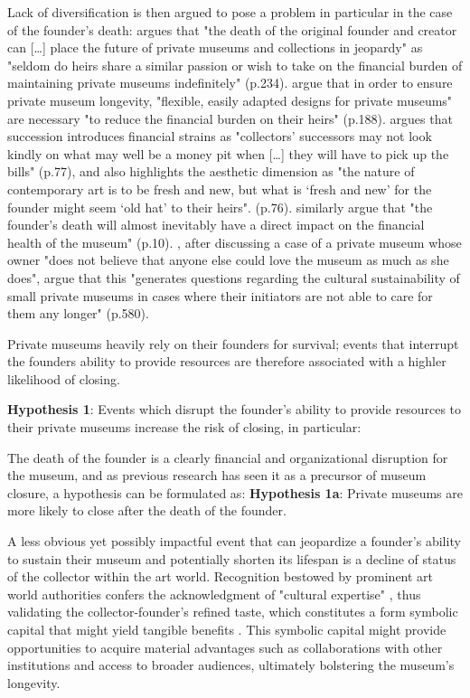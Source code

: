 \documentclass[12pt]{article}
\begin{document}
Lack of diversification is then argued to pose a problem in particular in the case of the founder's death:
\textcite{Walker_2019_collector} argues that "the death of the original founder and creator can [\ldots{}] place the future of private museums and collections in jeopardy" as "seldom do heirs share a similar passion or wish to take on the financial burden of maintaining private museums indefinitely" (p.234). 
\textcite{Bechtler_Imhof_2018_future} argue that in order to ensure private museum longevity, "flexible, easily adapted designs for private museums" are necessary "to reduce the financial burden on their heirs" (p.188).
\textcite{Adam_2021_rise} argues that succession introduces financial strains as "collectors’ successors may not look kindly on what may well be a money pit when [\ldots{}] they will have to pick up the bills" (p.77), and also highlights the aesthetic dimension as "the nature of contemporary art is to be fresh and new, but what is ‘fresh and new’ for the founder might seem ‘old hat’ to their heirs". (p.76).
\textcite{Velthuis_Gera_2024_fragility} similarly argue that "the founder’s death will almost inevitably have a direct impact on the financial health of the museum" (p.10).
\textcite{StylianouLambert_etal_2014_museums}, after discussing a case of a private museum whose owner "does not believe that anyone else could love the museum as much as she does", argue that this "generates questions regarding the cultural sustainability of small private museums in cases where their initiators are not able to care for them any longer" (p.580).



Private museums heavily rely on their founders for survival; events that interrupt the founders ability to provide resources are therefore associated with a highler likelihood of closing.

\textbf{Hypothesis 1}: Events which disrupt the founder's ability to provide resources to their private museums increase the risk of closing, in particular:

The death of the founder is a clearly financial and organizational disruption for the museum, and as previous research has seen it as a precursor of museum closure, a hypothesis can be formulated as: 
\textbf{Hypothesis 1a}: Private museums are more likely to close after the death of the founder.


A less obvious yet possibly impactful event that can jeopardize a founder's ability to sustain their museum and potentially shorten its lifespan is a decline of status of the collector within the art world.
Recognition bestowed by prominent art world authorities confers the acknowledgment of "cultural expertise" \parencite[p.1486]{Braden_2016_recognition}, thus validating the collector-founder's refined taste, which constitutes a form symbolic capital that might yield tangible benefits \parencite{Bourdieu_1993_production}.
This symbolic capital might provide opportunities to acquire material advantages such as collaborations with other institutions and access to broader audiences, ultimately bolstering the museum's longevity.
\end{document}
